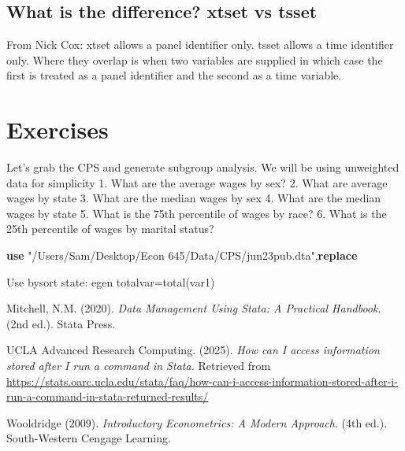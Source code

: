 \documentclass[
]{book}
\newenvironment{Shaded}{\begin{snugshade}}{\end{snugshade}}
\newcommand{\KeywordTok}[1]{\textcolor[rgb]{0.13,0.29,0.53}{\textbf{#1}}}
\newcommand{\NormalTok}[1]{#1}
\newcommand{\StringTok}[1]{\textcolor[rgb]{0.31,0.60,0.02}{#1}}
\begin{document}
\subsection*{What is the difference? xtset vs tsset}\label{what-is-the-difference-xtset-vs-tsset}

From Nick Cox:
xtset allows a panel identifier only. tsset allows a time identifier only.
Where they overlap is when two variables are supplied in which case the first
is treated as a panel identifier and the second as a time variable.

\section{Exercises}\label{exercises}

Let's grab the CPS and generate subgroup analysis. We will be using unweighted data for simplicity
1. What are the average wages by sex?
2. What are average wages by state
3. What are the median wages by sex
4. What are the median wages by state
5. What is the 75th percentile of wages by race?
6. What is the 25th percentile of wages by marital status?

\begin{Shaded}
\begin{Highlighting}[]
\KeywordTok{use} \StringTok{"/Users/Sam/Desktop/Econ 645/Data/CPS/jun23pub.dta"}\NormalTok{,}\KeywordTok{replace}
\end{Highlighting}
\end{Shaded}

Use bysort state: egen totalvar=total(var1)

Mitchell, N.M. (2020). \emph{Data Management Using Stata: A Practical Handbook}. (2nd ed.). Stata Press.

UCLA Advanced Research Computing. (2025). \emph{How can I access information stored after I run a command in Stata.} Retrieved from \url{https://stats.oarc.ucla.edu/stata/faq/how-can-i-access-information-stored-after-i-run-a-command-in-stata-returned-results/}

Wooldridge (2009). \emph{Introductory Econometrics: A Modern Approach}. (4th ed.). South-Western Cengage Learning.


\end{document}
